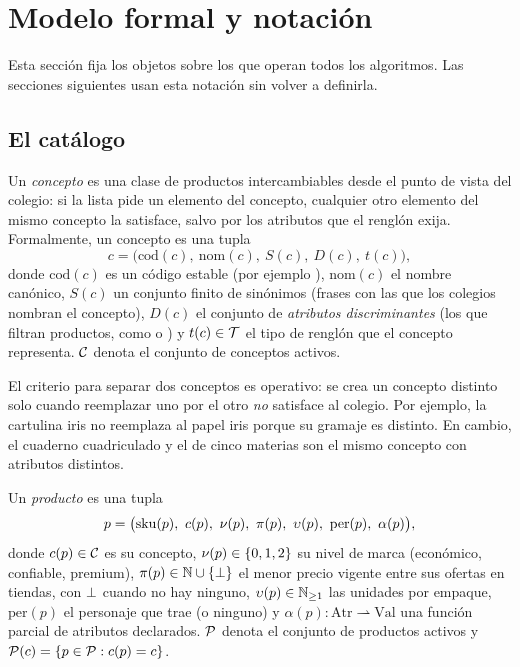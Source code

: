 \section{Modelo formal y notación}
\label{sec:modelo}

Esta sección fija los objetos sobre los que operan todos los algoritmos. Las
secciones siguientes usan esta notación sin volver a definirla.

\subsection{El catálogo}

\begin{definicion}[Concepto]
\label{def:concepto}
Un \emph{concepto} es una clase de productos intercambiables desde el punto de
vista del colegio: si la lista pide un elemento del concepto, cualquier otro
elemento del mismo concepto la satisface, salvo por los atributos que el
renglón exija. Formalmente, un concepto es una tupla
\[
  c = \bigl(\mathrm{cod}(c),\ \mathrm{nom}(c),\ S(c),\ D(c),\ t(c)\bigr),
\]
donde $\mathrm{cod}(c)$ es un código estable (por ejemplo ),
$\mathrm{nom}(c)$ el nombre canónico, $S(c)$ un conjunto finito de sinónimos
(frases con las que los colegios nombran el concepto), $D(c)$ el conjunto de
\emph{atributos discriminantes} (los que filtran productos, como
 o ) y $t(c)\in\mathcal{T}$ el tipo de renglón que el
concepto representa. $\mathcal{C}$ denota el conjunto de conceptos activos.
\end{definicion}

El criterio para separar dos conceptos es operativo: se crea un concepto
distinto solo cuando reemplazar uno por el otro \emph{no} satisface al colegio.
Por ejemplo, la cartulina iris no reemplaza al papel iris porque su gramaje es
distinto. En cambio, el cuaderno cuadriculado y el de cinco materias son el
mismo concepto con atributos distintos.

\begin{definicion}
\label{def:producto}
Un \emph{producto} es una tupla
\[
  p = \bigl(\mathrm{sku}(p),\ c(p),\ \nu(p),\ \pi(p),\ \upsilon(p),\
           \mathrm{per}(p),\ \alpha(p)\bigr),
\]
donde $c(p)\in\mathcal{C}$ es su concepto, $\nu(p)\in\{0,1,2\}$ su nivel de marca
(económico, confiable, premium), $\pi(p)\in\mathbb{N}\cup\{\bot\}$ el menor
precio vigente entre sus ofertas en tiendas, con $\bot$ cuando no hay
ninguno, $\upsilon(p)\in\mathbb{N}_{\geq 1}$ las unidades por empaque,
$\mathrm{per}(p)$ el personaje que trae (o ninguno) y
$\alpha(p)\colon \mathrm{Atr}\rightharpoonup \mathrm{Val}$ una función parcial
de atributos declarados. $\mathcal{P}$ denota el conjunto de productos activos y
$\mathcal{P}(c)=\{p\in\mathcal{P} : c(p)=c\}$.
\end{definicion}

